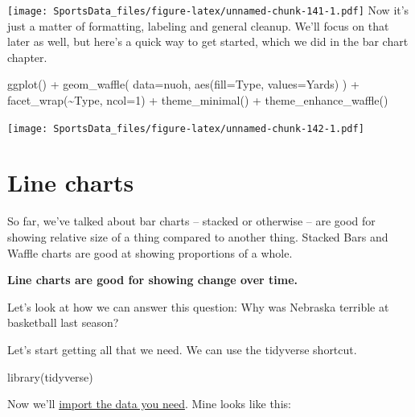 \documentclass[
]{book}
\newenvironment{Shaded}{\begin{snugshade}}{\end{snugshade}}
\newcommand{\AttributeTok}[1]{\textcolor[rgb]{0.77,0.63,0.00}{#1}}
\newcommand{\DecValTok}[1]{\textcolor[rgb]{0.00,0.00,0.81}{#1}}
\newcommand{\FunctionTok}[1]{\textcolor[rgb]{0.00,0.00,0.00}{#1}}
\newcommand{\NormalTok}[1]{#1}
\newcommand{\SpecialCharTok}[1]{\textcolor[rgb]{0.00,0.00,0.00}{#1}}
\begin{document}
\texttt{[image: SportsData\_files/figure-latex/unnamed-chunk-141-1.pdf]}
Now it's just a matter of formatting, labeling and general cleanup. We'll focus on that later as well, but here's a quick way to get started, which we did in the bar chart chapter.

\begin{Shaded}
\begin{Highlighting}[]
\FunctionTok{ggplot}\NormalTok{() }\SpecialCharTok{+} \FunctionTok{geom\_waffle}\NormalTok{(}
  \AttributeTok{data=}\NormalTok{nuoh,}
  \FunctionTok{aes}\NormalTok{(}\AttributeTok{fill=}\NormalTok{Type, }\AttributeTok{values=}\NormalTok{Yards)}
\NormalTok{) }\SpecialCharTok{+}  
    \FunctionTok{facet\_wrap}\NormalTok{(}\SpecialCharTok{\textasciitilde{}}\NormalTok{Type, }\AttributeTok{ncol=}\DecValTok{1}\NormalTok{) }\SpecialCharTok{+} 
    \FunctionTok{theme\_minimal}\NormalTok{() }\SpecialCharTok{+} 
    \FunctionTok{theme\_enhance\_waffle}\NormalTok{()}
\end{Highlighting}
\end{Shaded}

\texttt{[image: SportsData\_files/figure-latex/unnamed-chunk-142-1.pdf]}

\hypertarget{line-charts}{%
\chapter{Line charts}\label{line-charts}}

So far, we've talked about bar charts -- stacked or otherwise -- are good for showing relative size of a thing compared to another thing. Stacked Bars and Waffle charts are good at showing proportions of a whole.

\textbf{Line charts are good for showing change over time.}

Let's look at how we can answer this question: Why was Nebraska terrible at basketball last season?

Let's start getting all that we need. We can use the tidyverse shortcut.

\begin{Shaded}
\begin{Highlighting}[]
\FunctionTok{library}\NormalTok{(tidyverse)}
\end{Highlighting}
\end{Shaded}

Now we'll \href{https://unl.box.com/s/fozp95j76gbc08qqoe01ozcxzsz801ns}{import the data you need}. Mine looks like this:
\end{document}
